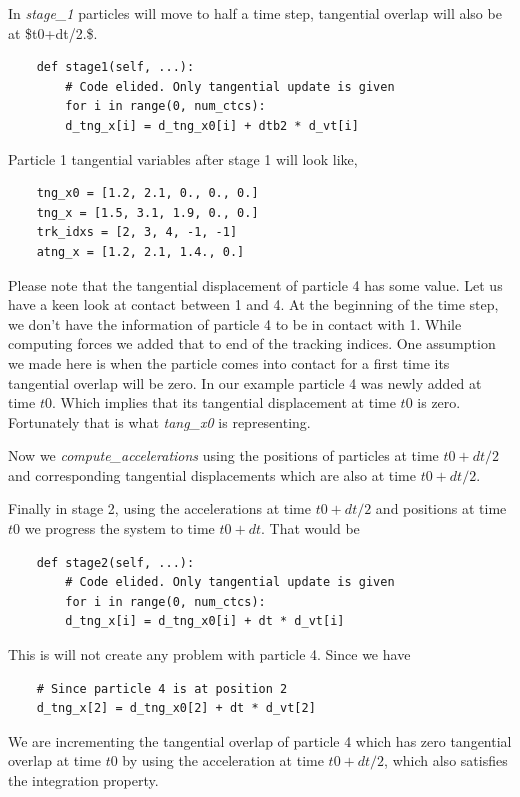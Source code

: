 \documentclass[11pt]{article}
\begin{document}
In \emph{stage\_1} particles will move to half a time step, tangential overlap will
also be at \$t0+dt/2.\$.


\begin{verbatim}
	def stage1(self, ...):
	    # Code elided. Only tangential update is given
	    for i in range(0, num_ctcs):
		d_tng_x[i] = d_tng_x0[i] + dtb2 * d_vt[i]
\end{verbatim}

Particle 1 tangential variables after stage 1 will look like,

\begin{verbatim}
	tng_x0 = [1.2, 2.1, 0., 0., 0.]
	tng_x = [1.5, 3.1, 1.9, 0., 0.]
	trk_idxs = [2, 3, 4, -1, -1]
	atng_x = [1.2, 2.1, 1.4., 0.]
\end{verbatim}

Please note that the tangential displacement of particle 4 has some
value. Let us have a keen look at contact between 1 and 4. At the beginning
of the time step, we don't have the information of particle 4 to be in
contact with 1. While computing forces we added that to end of the tracking
indices. One assumption we made here is when the particle comes into contact
for a first time its tangential overlap will be zero. In our example particle
4 was newly added at time \(t0\). Which implies that its tangential
displacement at time \(t0\) is zero. Fortunately that is what \emph{tang\_x0} is
representing.

Now we \emph{compute\_accelerations} using the positions of particles at time
\(t0+dt/2\) and corresponding tangential displacements which are also
at time \(t0+dt/2\).

Finally in stage 2, using the accelerations at time \(t0+dt/2\) and positions
at time \(t0\) we progress the system to time \(t0+dt\). That would be

\begin{verbatim}
	def stage2(self, ...):
	    # Code elided. Only tangential update is given
	    for i in range(0, num_ctcs):
		d_tng_x[i] = d_tng_x0[i] + dt * d_vt[i]
\end{verbatim}

This is will not create any problem with particle 4. Since we have

\begin{verbatim}
	# Since particle 4 is at position 2
	d_tng_x[2] = d_tng_x0[2] + dt * d_vt[2]
\end{verbatim}

We are incrementing the tangential overlap of particle 4 which has zero
tangential overlap at time \(t0\) by using the acceleration at time \(t0+dt/2\),
which also satisfies the integration property.
\end{document}
